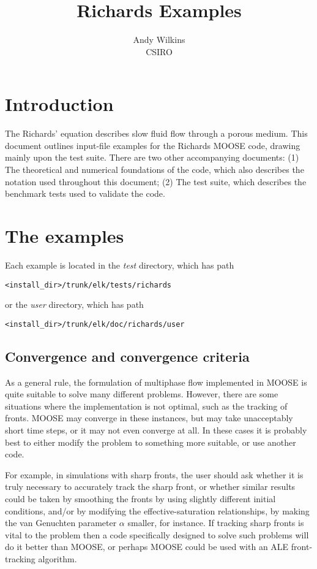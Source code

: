 \documentclass[]{scrreprt}
\begin{document}
\title{Richards Examples}
\author{Andy Wilkins \\
CSIRO}
\maketitle

\tableofcontents

\chapter{Introduction}

The Richards' equation describes slow fluid flow through a porous
medium.  This document outlines input-file examples for the Richards
MOOSE code, drawing mainly upon the test suite.  There are two other
accompanying documents: (1) The theoretical and numerical foundations
of the code, which also describes the notation used throughout this
document; (2) The test suite, which describes the benchmark tests used
to validate the code. 


\chapter{The examples}

Each example is located in the {\em test} directory, which has path
\begin{verbatim}
<install_dir>/trunk/elk/tests/richards
\end{verbatim}
or the {\em user} directory, which has path
\begin{verbatim}
<install_dir>/trunk/elk/doc/richards/user
\end{verbatim}

\section{Convergence and convergence criteria}

As a general rule, the formulation of multiphase flow implemented in
MOOSE is quite suitable to solve many different problems.  However,
there are some situations where the implementation is not optimal,
such as the tracking of fronts.  MOOSE may converge in these
instances, but may take unacceptably short time steps, or it may not
even converge at all.  In these cases it is probably best to either
modify the problem to something more suitable, or use another code.

For example, in simulations with sharp fronts, the user should ask
whether it is truly necessary to accurately track the sharp front, or
whether similar results could be taken by smoothing the fronts by
using slightly different initial conditions, and/or by modifying the
effective-saturation relationships, by making the van Genuchten
parameter $\alpha$ smaller, for instance.  If tracking sharp fronts is
vital to the problem then a code specifically designed to solve such
problems will do it better than MOOSE, or perhaps MOOSE could be used
with an ALE front-tracking algorithm.
\end{document}
